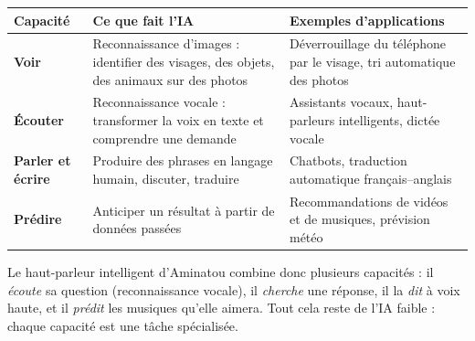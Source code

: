 \documentclass[11pt]{article}
\begin{document}
\begin{center}
\begin{tabularx}{\linewidth}{|l|X|X|}
\hline
\rowcolor{popblueL} \textbf{Capacité} & \textbf{Ce que fait l'IA} & \textbf{Exemples d'applications} \\
\hline
\textbf{Voir} & Reconnaissance d'images : identifier des visages, des objets, des animaux sur des photos & Déverrouillage du téléphone par le visage, tri automatique des photos \\
\hline
\textbf{Écouter} & Reconnaissance vocale : transformer la voix en texte et comprendre une demande & Assistants vocaux, haut-parleurs intelligents, dictée vocale \\
\hline
\textbf{Parler et écrire} & Produire des phrases en langage humain, discuter, traduire & Chatbots, traduction automatique français--anglais \\
\hline
\textbf{Prédire} & Anticiper un résultat à partir de données passées & Recommandations de vidéos et de musiques, prévision météo \\
\hline
\end{tabularx}
\end{center}

Le haut-parleur intelligent d'Aminatou combine donc plusieurs capacités : il \emph{écoute} sa question (reconnaissance vocale), il \emph{cherche} une réponse, il la \emph{dit} à voix haute, et il \emph{prédit} les musiques qu'elle aimera. Tout cela reste de l'IA faible : chaque capacité est une tâche spécialisée.
\end{document}

